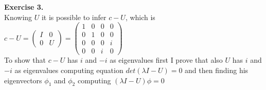 \documentclass{article}
\begin{document}
\pagebreak


\textbf{Exercise 3.} \\

Knowing $U$ it is possible to infer $c-U$, which is $c-U = \left(
    \begin{array}{cccc} 
        I & 0 \\
        0 & U 
    \end{array} \right) = \left(
    \begin{array}{cccc} 
        1 & 0 & 0 & 0 \\
        0 & 1 & 0 & 0 \\
        0 & 0 & 0 & i \\
        0 & 0 & i & 0
    \end{array} \right)$\\
To show that  $c-U$ has $i$ and $-i$ as eigenvalues first I prove that also $U$ has $i$ and $-i$ as eigenvalues computing equation $det(\lambda I - U) = 0$ and then finding his eigenvectors $\phi_1$ and $\phi_2$ computing $(\lambda I - U) \phi = 0 $
\end{document}
